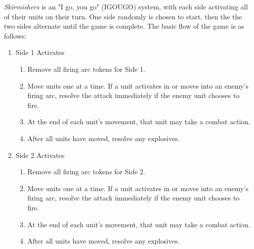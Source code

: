 \emph{Skirmishers} is an "I go, you go" (IGOUGO) system, with each side activating all of their units on their turn.
One side randomly is chosen to start, then the the two sides alternate until the game is complete.
The basic flow of the game is as follows:

\begin{enumerate}

  \item Side 1 Activates

  \begin{enumerate}

    \item Remove all firing arc tokens for Side 1.

    \item Move units one at a time.
       If a unit activates in or moves into an enemy's firing arc, resolve the attack immediately if the enemy unit chooses to fire.

    \item At the end of each unit's movement, that unit may take a combat action.

    \item After all units have moved, resolve any explosives.

  \end{enumerate}

  \item Side 2 Activates

  \begin{enumerate}

    \item Remove all firing arc tokens for Side 2.

    \item Move units one at a time.
       If a unit activates in or moves into an enemy's firing arc, resolve the attack immediately if the enemy unit chooses to fire.

    \item At the end of each unit's movement, that unit may take a combat action.

    \item After all units have moved, resolve any explosives.

  \end{enumerate}

\end{enumerate}
